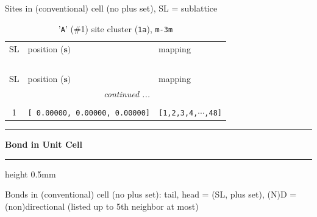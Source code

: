 \documentclass[fleqn,10pt,landscape]{jsarticle}
\begin{document}
\noindent Sites in (conventional) cell (no plus set), SL = sublattice

\renewcommand{\arraystretch}{1.6}
\begin{longtable}[l]{cll}
\captionsetup{justification=raggedright, singlelinecheck=off}
\caption{'\texttt{A}' (\#1) site cluster (\texttt{1a}), \texttt{m-3m}}
 \\
 \hline \hline
SL & position ($\bm{s})$ & mapping \\ \hline \endfirsthead

\multicolumn{2}{l}{\tablename\ \thetable{}} \\
 \hline \hline
SL & position ($\bm{s})$ & mapping \\ \hline \endhead

 \hline \hline
\multicolumn{2}{r}{\footnotesize\it continued ...} \\ \endfoot

 \hline \hline
\multicolumn{2}{r}{} \\ \endlastfoot

1 & \texttt{[ 0.00000, 0.00000, 0.00000]} & \texttt{[1,2,3,4,$\cdots$,48]} \\
\end{longtable}
\vspace{5mm}
\noindent \rule[0.5mm]{5mm}{0.5mm}\hspace{3mm}\textbf{Bond in Unit Cell}\hspace{3mm}\leaders\hrule height 0.5mm\hfill\kern0pt
\vspace{3mm}

\noindent Bonds in (conventional) cell (no plus set): tail, head = (SL, plus set), (N)D = (non)directional (listed up to 5th neighbor at most)
\end{document}
